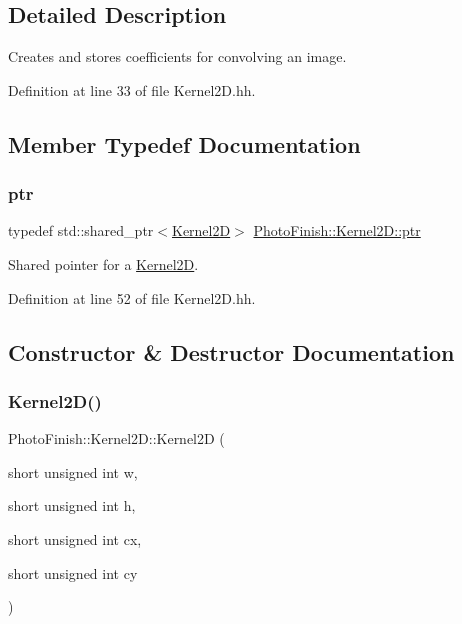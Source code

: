 \subsection{Detailed Description}
Creates and stores coefficients for convolving an image. 

Definition at line 33 of file Kernel2\+D.\+hh.



\subsection{Member Typedef Documentation}
\mbox{\label{class_photo_finish_1_1_kernel2_d_a7a209c34b3c8edb54835f1bab1244970}} 
\subsubsection{\texorpdfstring{ptr}{ptr}}
{\footnotesize\ttfamily typedef std\+::shared\+\_\+ptr$<$\hyperlink{class_photo_finish_1_1_kernel2_d}{Kernel2D}$>$ \hyperlink{class_photo_finish_1_1_kernel2_d_a7a209c34b3c8edb54835f1bab1244970}{Photo\+Finish\+::\+Kernel2\+D\+::ptr}}



Shared pointer for a \hyperlink{class_photo_finish_1_1_kernel2_d}{Kernel2D}. 



Definition at line 52 of file Kernel2\+D.\+hh.



\subsection{Constructor \& Destructor Documentation}
\mbox{\label{class_photo_finish_1_1_kernel2_d_a43c7b680295addf6ec51d57be59af461}} 
\subsubsection{\texorpdfstring{Kernel2\+D()}{Kernel2D()}\hspace{0.1cm}{\footnotesize\ttfamily [1/3]}}
{\footnotesize\ttfamily Photo\+Finish\+::\+Kernel2\+D\+::\+Kernel2D (\begin{DoxyParamCaption}\item[{short unsigned int}]{w,  }\item[{short unsigned int}]{h,  }\item[{short unsigned int}]{cx,  }\item[{short unsigned int}]{cy }\end{DoxyParamCaption})\hspace{0.3cm}{\ttfamily [protected]}}



